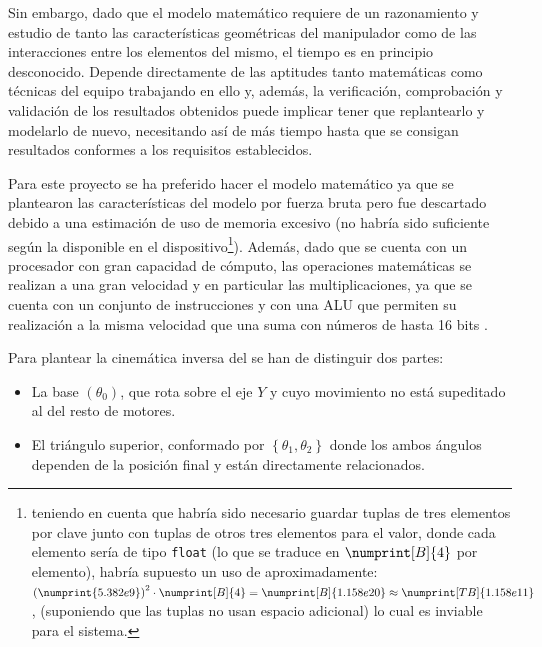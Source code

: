 \begin{itemize}
          Sin embargo, dado que el modelo matemático requiere de un razonamiento y estudio
          de tanto las características geométricas del manipulador como de las interacciones
          entre los elementos del mismo, el tiempo es en principio desconocido. Depende
          directamente de las aptitudes tanto matemáticas como técnicas del equipo trabajando
          en ello y, además, la verificación, comprobación y validación de los resultados
          obtenidos puede implicar tener que replantearlo y modelarlo de nuevo, necesitando
          así de más tiempo hasta que se consigan resultados conformes a los requisitos
          establecidos.
\end{itemize}

Para este proyecto se ha preferido hacer el modelo matemático ya que se plantearon las
características del modelo por fuerza bruta pero fue descartado debido a una estimación de
uso de memoria excesivo (no habría sido suficiente según la disponible en el dispositivo\footnote{teniendo en cuenta
    que habría sido necesario guardar tuplas de tres elementos por clave junto con tuplas de
    otros tres elementos para el valor, donde cada elemento sería de tipo \texttt{float}
    (lo que se traduce en $\numprint[B]{4}$ por elemento), habría supuesto un uso de
    aproximadamente: $\left(\numprint{5.382e9}\right)^2 \cdot \numprint[B]{4} = \numprint[B]{1.158e20} \approx \numprint[TB]{1.158e11} $,
    (suponiendo que las tuplas no usan espacio adicional) lo cual es inviable para el sistema.}).
Además, dado que se cuenta con un procesador con gran capacidad de cómputo, las operaciones
matemáticas se realizan a una gran velocidad y en particular las multiplicaciones, ya que
se cuenta con un conjunto de instrucciones y con una \ac{ALU} que permiten su realización
a la misma velocidad que una suma con números de hasta 16 bits \cite{microchipDsPIC33EPIC24EFRM2010}.

Para plantear la cinemática inversa del \pArm{} se han de distinguir dos partes:
\begin{itemize}
    \item La base $\left(\theta_0\right)$, que rota sobre el eje $Y$ y cuyo movimiento no está supeditado al
          del resto de motores.

    \item El triángulo superior, conformado por $\left\{\theta_1, \theta_2\right\}$ donde
          los ambos ángulos dependen de la posición final y están directamente relacionados.
\end{itemize}

